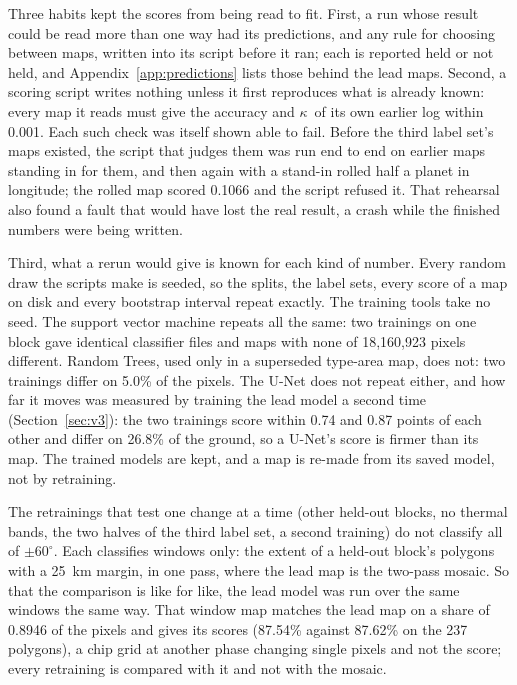 \documentclass[twocolumn]{aastex701}
\newcommand{\pmsixty}{$\pm60^{\circ}$}
\newcommand{\kap}{$\kappa$}
\begin{document}
Three habits kept the scores from being read to fit. First, a run whose result could be read more than one way had
its predictions, and any rule for choosing between maps, written into its script before it ran; each is reported held
or not held, and Appendix~\ref{app:predictions} lists those behind the lead maps. Second, a scoring script writes
nothing unless it first reproduces what is already known: every map it reads must give the accuracy and \kap\ of its
own earlier log within 0.001. Each such check was itself shown able to fail. Before the third label set's maps
existed, the script that judges them was run end to end on earlier maps standing in for them, and then again with a
stand-in rolled half a planet in longitude; the rolled map scored 0.1066 and the script refused it. That rehearsal
also found a fault that would have lost the real result, a crash while the finished numbers were being written.

Third, what a rerun would give is known for each kind of number. Every random draw the scripts make is seeded, so
the splits, the label sets, every score of a map on disk and every bootstrap interval repeat exactly. The training
tools take no seed. The support vector machine repeats all the same: two trainings on one block gave identical
classifier files and maps with none of 18,160,923 pixels different. Random Trees, used only in a superseded
type-area map, does not: two trainings differ on 5.0\% of the pixels. The U-Net does not repeat either, and how far
it moves was measured by training the lead model a second time (Section~\ref{sec:v3}): the two trainings score within
0.74 and 0.87 points of each other and differ on 26.8\% of the ground, so a U-Net's score is firmer than its map. The
trained models are kept, and a map is re-made from its saved model, not by retraining. %

The retrainings that test one change at a time (other held-out blocks, no thermal bands, the two halves of the
third label set, a second training) do not classify all of \pmsixty. Each classifies windows only: the extent of a
held-out block's polygons with a 25~km margin, in one pass, where the lead map is the two-pass mosaic. So that the
comparison is like for like, the lead model was run over the same windows the same way. That window map matches the
lead map on a share of 0.8946 of the pixels and gives its scores (87.54\% against 87.62\% on the 237 polygons), a
chip grid at another phase changing single pixels and not the score; every retraining is compared with it and not
with the mosaic. %
\end{document}
